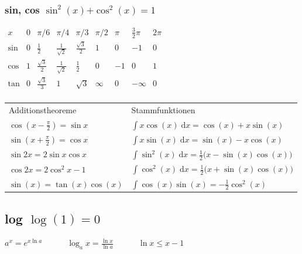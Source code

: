 \documentclass[6pt,a4paper]{scrartcl}
\newcommand{\bs}[1]{\ensuremath{\boldsymbol{#1}}}                              %
\newcommand{\diff}{\ensuremath{\;\mathrm d}}                                   %
\begin{document}
\begin{multicols*}{4}

    \subsubsection{sin, cos \quad $\sin^2(x) \bs + \cos^2(x) = 1$}
    $\begin{array}{c|c|c|c|c|c|c|c|c}
            x    & 0 & \pi / 6            & \pi / 4            & \pi / 3           & \pi / 2 & \pi & \frac{3}{2}\pi & 2 \pi \\ \hline
            \sin & 0 & \frac{1}{2}        & \frac{1}{\sqrt{2}} & \frac{\sqrt 3}{2} & 1       & 0   & -1             & 0     \\
            \cos & 1 & \frac{\sqrt 3}{2}  & \frac{1}{\sqrt 2}  & \frac{1}{2}       & 0       & -1  & 0              & 1     \\
            \tan & 0 & \frac{\sqrt{3}}{3} & 1                  & \sqrt{3}          & \infty  & 0   & - \infty       & 0     \\
        \end{array}$
    \begin{tabular}{l  l}
        Additionstheoreme                   & Stammfunktionen                                                    \\
        $\cos (x - \frac{\pi}{2}) = \sin x$ & $\int x \cos(x) \diff x = \cos(x) + x \sin(x)$                     \\

        $\sin (x + \frac{\pi}{2}) = \cos x$ & $\int x \sin(x) \diff x = \sin(x) - x \cos(x)$                     \\

        $\sin 2x = 2 \sin x \cos x $        & $\int \sin^2(x) \diff x = \frac12 \bigl(x - \sin(x)\cos(x) \bigr)$ \\

        $\cos 2x = 2\cos^2 x - 1$           & $\int \cos^2(x) \diff x = \frac12 \bigl(x + \sin(x)\cos(x) \bigr)$ \\

        $\sin(x) = \tan(x)\cos(x)$          & $\int \cos(x)\sin(x) = -\frac12 \cos^2(x)$                         \\
    \end{tabular}

    \subsection{log \quad $\log(1) = 0$}
    $a^x = e^{x \ln a} \qquad \quad \log_a x = \frac{\ln x}{\ln a} \qquad \quad \ln x \le x -1$


\end{multicols*}
\end{document}
